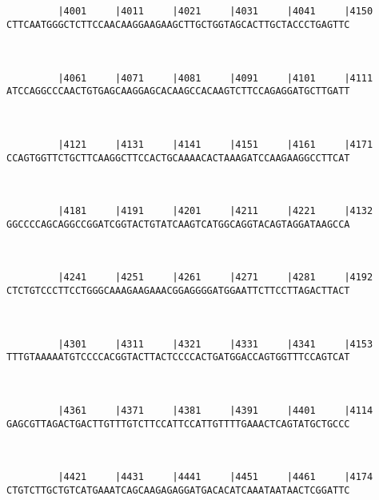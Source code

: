 \documentclass{article}
\begin{document}
\begin{Verbatim}
                                                            
   
         |4001     |4011     |4021     |4031     |4041     |4150
CTTCAATGGGCTCTTCCAACAAGGAAGAAGCTTGCTGGTAGCACTTGCTACCCTGAGTTC
                                                            
                                                            
   
         |4061     |4071     |4081     |4091     |4101     |4111
ATCCAGGCCCAACTGTGAGCAAGGAGCACAAGCCACAAGTCTTCCAGAGGATGCTTGATT
                                                            
                                                            
   
         |4121     |4131     |4141     |4151     |4161     |4171
CCAGTGGTTCTGCTTCAAGGCTTCCACTGCAAAACACTAAAGATCCAAGAAGGCCTTCAT
                                                            
                                                            
   
         |4181     |4191     |4201     |4211     |4221     |4132
GGCCCCAGCAGGCCGGATCGGTACTGTATCAAGTCATGGCAGGTACAGTAGGATAAGCCA
                                                            
                                                            
   
         |4241     |4251     |4261     |4271     |4281     |4192
CTCTGTCCCTTCCTGGGCAAAGAAGAAACGGAGGGGATGGAATTCTTCCTTAGACTTACT
                                                            
                                                            
   
         |4301     |4311     |4321     |4331     |4341     |4153
TTTGTAAAAATGTCCCCACGGTACTTACTCCCCACTGATGGACCAGTGGTTTCCAGTCAT
                                                            
                                                            
   
         |4361     |4371     |4381     |4391     |4401     |4114
GAGCGTTAGACTGACTTGTTTGTCTTCCATTCCATTGTTTTGAAACTCAGTATGCTGCCC
                                                            
                                                            
   
         |4421     |4431     |4441     |4451     |4461     |4174
CTGTCTTGCTGTCATGAAATCAGCAAGAGAGGATGACACATCAAATAATAACTCGGATTC
                                                            

\end{Verbatim}
\end{document}
